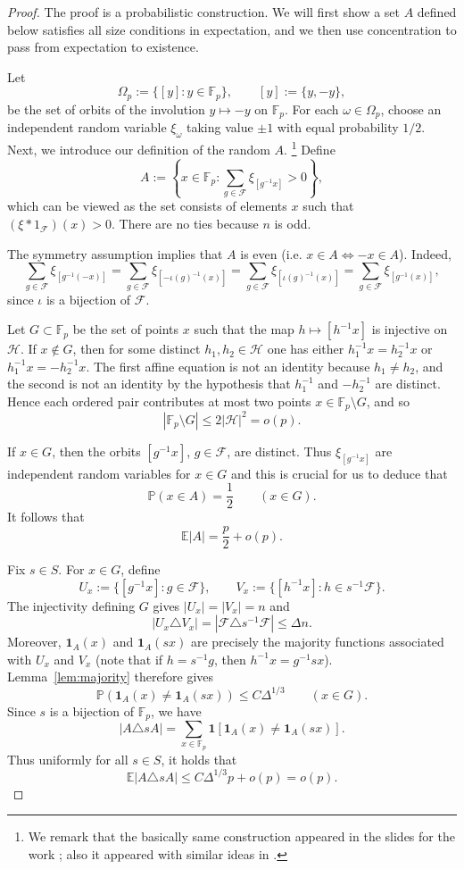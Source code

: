 \documentclass[11pt,letterpaper,reqno]{amsart}
\theoremstyle{definition}
\newcommand{\F}{\mathbb F}
\newcommand{\E}{\mathbb E}
\newcommand{\1}{\mathbf 1}
\begin{document}
\begin{proof} The proof is a probabilistic construction. We will first show a set $A$ defined below satisfies all size conditions in expectation, and we then use concentration to pass from expectation to existence.


Let
\[
    \Omega_p:=\{[y]:y\in\F_p\},\qquad [y]:=\{y,-y\},
\]
be the set of orbits of the involution $y\mapsto -y$ on $\F_p$.
For each $\omega\in\Omega_p$, choose an independent
random variable $\xi_\omega$ taking value $\pm1$ with equal probability $1/2$.  Next, we introduce our definition of the random $A$. \footnote{We remark that the basically same construction appeared in the slides \cite{Pete2020} for the work \cite
{HutchcroftPete2020}; also it appeared with similar ideas in \cite[Section 4]{green2003constructions}.} Define
\[
      A:=\left\{x\in\F_p:
        \sum_{g\in\mathcal F}\xi_{[g^{-1}x]}>0\right\}
,\]
which can be viewed as the set consists of elements $x$ such that  $(\xi \ast 1_\mathcal{F}) (x)>0$.
There are no ties because $n$ is odd.

The symmetry assumption implies that $A$ is even (i.e. $x \in A \iff -x\in A$). Indeed,
\[
    \sum_{g\in\mathcal F}\xi_{[g^{-1}(-x)]}
    =\sum_{g\in\mathcal F}\xi_{[-\iota(g)^{-1}(x)]}
    =\sum_{g\in\mathcal F}\xi_{[\iota(g)^{-1}(x)]}
    =\sum_{g\in\mathcal F}\xi_{[g^{-1}(x)]},
\]
since $\iota$ is a bijection of $\mathcal F$.

Let $G\subset\F_p$ be the set of points $x$ such that the map $h\longmapsto [h^{-1}x]$ is injective on $\mathcal H$.  If $x\notin G$, then for some distinct
$h_1,h_2\in\mathcal H$ one has either
$h_1^{-1}x=h_2^{-1}x$ or $h_1^{-1}x=-h_2^{-1}x$.  The first affine equation is
not an identity because $h_1\ne h_2$, and the second is not an identity by the hypothesis that $h_1^{-1}$ and $-h_2^{-1}$ are distinct. Hence each ordered pair contributes at most two points $x\in \F_p\setminus G $, and so
\[
|\F_p\setminus G|\le 2|\mathcal H|^2=o(p).
\]

If $x\in G$, then the orbits $[g^{-1}x]$, $g\in\mathcal F$, are distinct.
Thus $\xi_{[g^{-1}x]}$
are independent random variables for $x\in G$ and this is crucial for us to deduce that 
\[
 \mathbb P(x\in A)=\frac12\qquad (x\in G).
\]
It follows that
\[
        \E|A|=\frac p2+o(p).                         \tag{3.1}\label{eq:transfer-density}
\]

Fix $s\in S$.  For $x\in G$, define
\[
        U_x:=\{[g^{-1}x]:g\in\mathcal F\},
        \qquad
        V_x:=\{[h^{-1}x]:h\in s^{-1}\mathcal F\}.
\]
The injectivity defining $G$ gives $|U_x|=|V_x|=n$ and
\[
        |U_x\triangle V_x|
        =|\mathcal F\triangle s^{-1}\mathcal F|
        \le \Delta n.
\]
Moreover, $\1_A(x)$ and $\1_A(sx)$ are precisely the majority functions
associated with $U_x$ and $V_x$ (note that if $h=s^{-1}g$, then
$h^{-1}x=g^{-1}sx$).  Lemma~\ref{lem:majority} therefore gives
\[
        \mathbb P(\1_A(x)\ne \1_A(sx))\le C\Delta^{1/3}
        \qquad (x\in G).
\]
Since $s$ is a bijection of $\F_p$, we have 
\[
        |A\triangle sA|
        =\sum_{x\in\F_p}\1[\1_A(x)\ne\1_A(sx)].
\]
Thus uniformly for all $s\in S$, it holds that
\[
        \E |A\triangle sA|
        \le C\Delta^{1/3}p+o(p)=o(p).
\]


\end{proof}
\end{document}
